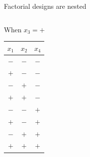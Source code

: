\documentclass[10pt]{beamer}
\newcommand\lo{\ensuremath{\boldsymbol{-}}}
\newcommand\hi{\ensuremath{\boldsymbol{+}}}
\begin{document}
\begin{frame}{Factorial designs are nested}
\begin{columns}
\begin{column}{0.3\textwidth}
\begin{center}
When $x_3 = \hi$
\medskip
\begin{tabular}{ccc}
$x_1$ & $x_2$ & $x_4$ \\
\hline
\rowcolor{pink} \lo & \lo & \lo \\
\rowcolor{pink} \hi & \lo & \lo \\
\rowcolor{pink} \lo & \hi & \lo \\
\rowcolor{pink} \hi & \hi & \lo \\
\rowcolor{pink} \lo & \lo & \hi \\
\rowcolor{pink} \hi & \lo & \hi \\
\rowcolor{pink} \lo & \hi & \hi \\
\rowcolor{pink} \hi & \hi & \hi \\
\end{tabular}
\end{center}
\end{column}

\end{columns}	
\end{frame}
\end{document}
